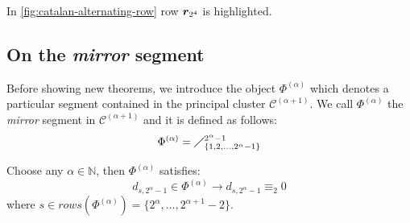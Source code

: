 
In \autoref{fig:catalan-alternating-row} row $\boldsymbol{r}_{2^{4}}$ is highlighted.

\subsection{On the \emph{mirror} segment}

Before showing new theorems, we introduce the object
$\Phi^{(\alpha)}$ which denotes a particular segment contained
in the principal cluster $\mathcal{C}^{(\alpha+1)}$.
We call $\Phi^{(\alpha)}$ the \emph{mirror} segment in
$\mathcal{C}^{(\alpha+1)}$ and it is defined as follows:
\begin{displaymath}
    \Phi^{(\alpha)}=\diagup_{\lbrace 1,2,\ldots,2^{\alpha}-1\rbrace}^{2^{\alpha}-1}
\end{displaymath}

\begin{theorem}
    Choose any $\alpha\in\mathbb{N}$, then $\Phi^{(\alpha)}$ satisfies:
    \begin{displaymath}
        d_{s,2^{\alpha}-1}\in\Phi^{(\alpha)} \rightarrow d_{s,2^{\alpha}-1}\equiv_{2}0
    \end{displaymath}
    where $s\in rows\left(\Phi^{(\alpha)}\right)=\lbrace2^{\alpha},\ldots,2^{\alpha+1}-2\rbrace$.
    \label{thm:mirror:segment:definition}
\end{theorem}

